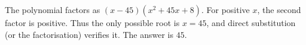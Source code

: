 The polynomial factors as $(x-45)(x^2+45x+8)$. For positive $x$, the second factor is positive. Thus the only possible root is $x=45$, and direct substitution (or the factorisation) verifies it. The answer is $\boxed{45}$.
